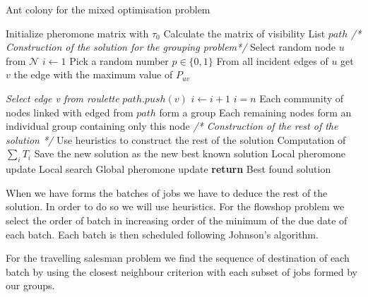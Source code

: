 \documentclass[UTF8, twoside]{EPURapport}
\begin{document}
\begin{algorithm}
  \caption{Ant colony for the mixed optimisation problem}
  \begin{algorithmic}[1]
  	  \State Initialize pheromone matrix with $\tau_0$
  	  \State Calculate the matrix of visibility
  	  \State List $path$
      		\State \textit{/* Construction of the solution for the grouping problem*/}
			\State Select random node $u$ from $\mathscr{N}$
    		\State $i \gets 1$
    		\Repeat
    			\State Pick a random number $p \in \{0,1\}$
    				\State From all incident edges of $u$ get $v$ the edge with the maximum value of $P_{uv}$
    				
				\Else
					\State \textit{Select edge v from roulette}
    			\EndIf
   					\State $path.push(v)$
   				\EndIf
   				\State $i \gets i+1$
    		\Until $i = n$
    		\State Each community of nodes linked with edged from $path$ form a group
    		\State Each remaining nodes form an individual group containing only this node
    		\State \textit{/* Construction of the rest of the solution */}
    		\State Use heuristics to construct the rest of the solution
    		\State Computation of $\underset{i}{\sum} T_i$
    			\State Save the new solution as the new best known solution
    		\EndIf
			\State Local pheromone update
        \EndFor
        \State Local search
        \State Global pheromone update
      \EndFor
      \State \textbf{return} Best found solution
  \end{algorithmic}
\end{algorithm}

\clearpage

	When we have forms the batches of jobs we have to deduce the rest of the solution. In order to do so we will use heuristics. For the flowshop problem we select the order of batch in increasing order of the minimum of the due date of each batch. Each batch is then scheduled following Johnson's algorithm.
	
	For the travelling salesman problem we find the sequence of destination of each batch by using the closest neighbour criterion with each subset of jobs formed by our groups.
\end{document}
